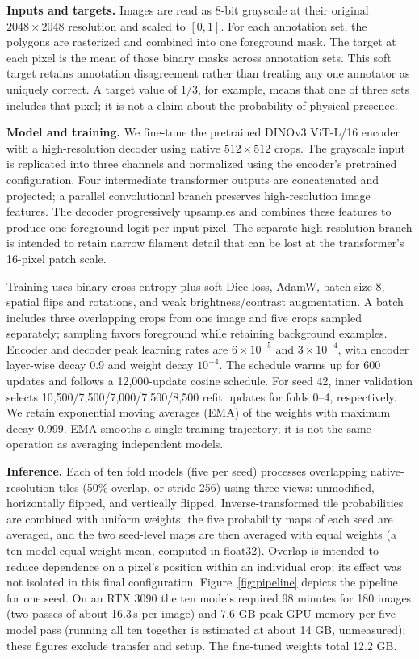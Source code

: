 \documentclass[sigconf]{acmart}
\begin{document}
\textbf{Inputs and targets.} Images are read as 8-bit grayscale at their original $2048\times2048$ resolution and scaled to $[0,1]$. For each annotation set, the polygons are rasterized and combined into one foreground mask. The target at each pixel is the mean of those binary masks across annotation sets. This soft target retains annotation disagreement rather than treating any one annotator as uniquely correct. A target value of $1/3$, for example, means that one of three sets includes that pixel; it is not a claim about the probability of physical presence.

\textbf{Model and training.} We fine-tune the pretrained DINOv3 ViT-L/16 encoder~\cite{dinov3} with a high-resolution decoder using native $512\times512$ crops. The grayscale input is replicated into three channels and normalized using the encoder's pretrained configuration. Four intermediate transformer outputs are concatenated and projected; a parallel convolutional branch preserves high-resolution image features. The decoder progressively upsamples and combines these features to produce one foreground logit per input pixel. The separate high-resolution branch is intended to retain narrow filament detail that can be lost at the transformer's 16-pixel patch scale.

Training uses binary cross-entropy plus soft Dice loss, AdamW, batch size 8, spatial flips and rotations, and weak brightness/contrast augmentation. A batch includes three overlapping crops from one image and five crops sampled separately; sampling favors foreground while retaining background examples. Encoder and decoder peak learning rates are $6\times10^{-5}$ and $3\times10^{-4}$, with encoder layer-wise decay 0.9 and weight decay $10^{-4}$. The schedule warms up for 600 updates and follows a 12,000-update cosine schedule. For seed 42, inner validation selects 10,500/7,500/7,000/7,500/8,500 refit updates for folds 0--4, respectively. We retain exponential moving averages (EMA) of the weights with maximum decay 0.999. EMA smooths a single training trajectory; it is not the same operation as averaging independent models.

\textbf{Inference.} Each of ten fold models (five per seed) processes overlapping native-resolution tiles (50\% overlap, or stride 256) using three views: unmodified, horizontally flipped, and vertically flipped. Inverse-transformed tile probabilities are combined with uniform weights; the five probability maps of each seed are averaged, and the two seed-level maps are then averaged with equal weights (a ten-model equal-weight mean, computed in float32). Overlap is intended to reduce dependence on a pixel's position within an individual crop; its effect was not isolated in this final configuration. Figure~\ref{fig:pipeline} depicts the pipeline for one seed. On an RTX 3090 the ten models required 98 minutes for 180 images (two passes of about 16.3\,s per image) and 7.6 GB peak GPU memory per five-model pass (running all ten together is estimated at about 14 GB, unmeasured); these figures exclude transfer and setup. The fine-tuned weights total 12.2 GB.
\end{document}
